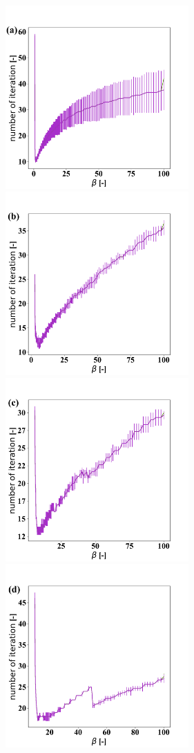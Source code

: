 \documentclass{article}
\begin{document}
\begin{figure}[h!]
   \centering
        \includegraphics[width=7.0cm, height=7.0cm]{pictures/ell_homo_diff_k_iipg_it_k1.pdf}
        \includegraphics[width=7.0cm, height=7.0cm]{pictures/ell_homo_diff_k_iipg_it_k2.pdf}
        \includegraphics[width=7.0cm, height=7.0cm]{pictures/ell_homo_diff_k_iipg_it_k3.pdf}
        \includegraphics[width=7.0cm, height=7.0cm]{pictures/ell_homo_diff_k_iipg_it_k4.pdf}

\end{figure}
\end{document}

